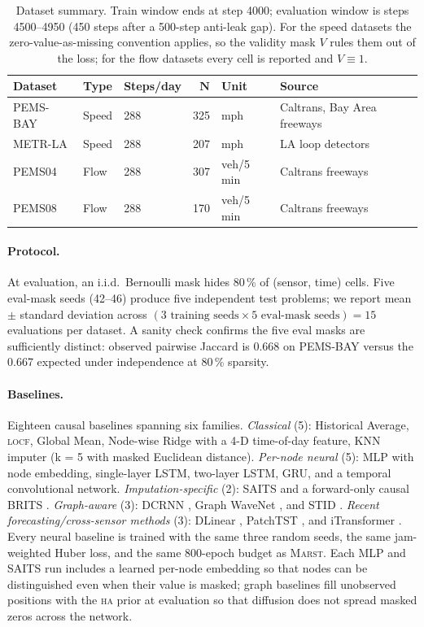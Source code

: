 \documentclass[11pt]{article}
\newcommand{\MARST}{\textsc{Marst}\xspace}
\newcommand{\LOCF}{\textsc{locf}\xspace}
\newcommand{\HA}{\textsc{ha}\xspace}
\begin{document}
\begin{table}[!htbp]
\centering
\caption{Dataset summary.  Train window ends at step 4000; evaluation
window is steps 4500--4950 (450 steps after a 500-step anti-leak gap).
For the speed datasets the zero-value-as-missing convention applies, so
the validity mask $V$ rules them out of the loss; for the flow datasets
every cell is reported and $V \equiv 1$.}
\label{tab:datasets}
\small
\begin{tabular}{lllrll}
\toprule
\textbf{Dataset} & \textbf{Type} & \textbf{Steps/day} & $\boldsymbol{N}$ & \textbf{Unit} & \textbf{Source} \\
\midrule
PEMS-BAY      & Speed & 288 & 325 & mph         & Caltrans, Bay Area freeways \\
METR-LA       & Speed & 288 & 207 & mph         & LA loop detectors \\
PEMS04        & Flow  & 288 & 307 & veh/5\,min  & Caltrans freeways \\
PEMS08        & Flow  & 288 & 170 & veh/5\,min  & Caltrans freeways \\
\bottomrule
\end{tabular}
\end{table}

\paragraph{Protocol.}  At evaluation, an i.i.d.\ Bernoulli mask hides
80\,\% of (sensor, time) cells.  Five eval-mask seeds (42--46) produce
five independent test problems; we report mean $\pm$ standard deviation
across $(3 \text{ training seeds} \times 5 \text{ eval-mask seeds}) =
15$ evaluations per dataset.  A sanity check confirms the five eval
masks are sufficiently distinct: observed pairwise Jaccard is 0.668 on
PEMS-BAY versus the 0.667 expected under independence at 80\,\%
sparsity.

\paragraph{Baselines.}  Eighteen causal baselines spanning six families.
\emph{Classical} (5): Historical Average, \LOCF, Global Mean,
Node-wise Ridge with a 4-D time-of-day feature, KNN imputer (k = 5
with masked Euclidean distance).  \emph{Per-node neural} (5): MLP with
node embedding, single-layer LSTM, two-layer LSTM, GRU, and a temporal
convolutional network.  \emph{Imputation-specific} (2): SAITS
\citep{du2023saits} and a forward-only causal BRITS
\citep{cao2018brits}.  \emph{Graph-aware} (3): DCRNN \citep{li2018dcrnn},
Graph WaveNet \citep{wu2019gwn}, and STID \citep{shao2022stid}.
\emph{Recent forecasting/cross-sensor methods} (3): DLinear
\citep{zeng2023dlinear}, PatchTST \citep{nie2023patchtst}, and
iTransformer \citep{liu2024itransformer}.  Every neural baseline is
trained with the same three random seeds, the same jam-weighted Huber
loss, and the same 800-epoch budget as \MARST.  Each MLP and SAITS run
includes a learned per-node embedding so that nodes can be
distinguished even when their value is masked; graph baselines fill
unobserved positions with the \HA prior at evaluation so that diffusion
does not spread masked zeros across the network.
\end{document}
